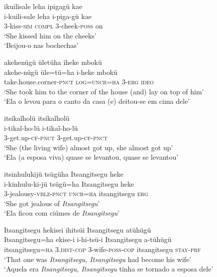\documentclass[output=paper,
modfonts,nonflat
]{langsci/langscibook}
\begin{document}
\ea ikuilisale leha ipigagü kae \\[.3em]
\gll i-kuili-sale	leha	i-piga-gü kae \\
3-kiss-\textsc{sim} 	\textsc{compl} 3-cheek-\textsc{poss} on \\
\glt ‘She kissed him on the cheeks’ \\
‘Beijou-o nas bochechas’ \\
\z

\ea akehenügü ületüha iheke mbokü \\[.3em]
\gll akehe-nügü			üle=tü=ha 		i-heke	mbokü{\footnotemark}{} \\
take.house.corner-\textsc{pnct} 	\textsc{log=uncr=ha} 	\textsc{3-erg}	\textsc{ideo} \\
\glt ‘She took him to the corner of the house (and) lay on top of him’ \\
‘Ela o levou para o canto da casa (e) deitou-se em cima dele’ \\
\z

\ea itsikaĩholü itsikaĩholü \\[.3em]
\gll i-tikaĩ-ho-lü		i-tikaĩ-ho-lü  \\
3-get.up-\textsc{cf-pnct} 3-get.up-\textsc{cf-pnct} \\
\glt ‘She (the living wife) almost got up, she almost got up’ \\
‘Ela (a esposa viva) quase se levantou, quase se levantou’ \\
\z

\ea itsinhulukijü tsügüha Itsangitsegu heke \\[.3em]
\gll i-kinhulu-ki-jü			tsügü=ha	Itsangitsegu	heke \\
3-jealousy-\textsc{vblz-pnct} 	\textsc{uncr=ha} 	itsangitsegu 	\textsc{erg} \\
\glt ‘She got jealous of \emph{Itsangitsegu}’ \\
‘Ela ficou com ciúmes de \emph{Itsangitsegu}’ \\
\z

\ea Itsangitsegu hekisei ihitsüi Itsangitsegu atühügü \\[.3em]
\gll Itsangitsegu=ha	ekise-i		i-hi-tsü-i	Itsangitsegu	a-tühügü \\
itsangitsegu=\textsc{ha} 	3.\textsc{dist-cop} 	3-wife-\textsc{poss-cop} 	itsangitsegu	\textsc{stay-prf} \\
\glt ‘That one was \emph{Itsangitsegu, Itsangitsegu} had become his wife’ \\
‘Aquela era \emph{Itsangitsegu, Itsangitsegu} tinha se tornado a esposa dele’ \\
\z
\end{document}
